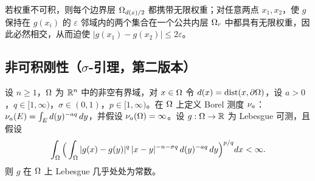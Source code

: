 \begin{remark}[直觉]
若权重不可积，则每个边界层 $\Omega_{d(x)/2}$ 都携带无限权重；对任意两点 $x_1,x_2$，使 $g$ 保持在 $g(x_i)$ 的 $\varepsilon$ 邻域内的两个集合在一个公共内层 $\Omega_{r}$ 中都具有无限权重，因此必然相交，从而迫使 $|g(x_1)-g(x_2)|\le 2\varepsilon$。
\end{remark}

\subsection{非可积刚性（\texorpdfstring{$\sigma$}{sigma}-引理，第二版本）}

\begin{lemma}[不可积刚性]
设 $n\ge 1$，$\Omega$ 为 $\mathbb{R}^n$ 中的非空有界域，对 $x\in\Omega$ 令 $d(x)=\operatorname{dist}(x,\partial\Omega)$，设 $a>0$，$q\in[1,\infty)$，$\sigma\in(0,1)$，$p\in[1,\infty)$。在 $\Omega$ 上定义 Borel 测度 $\nu_{a}$：$\nu_{a}(E)=\int_E d(y)^{-aq}\,dy$，并假设 $\nu_{a}(\Omega)=\infty$。设 $g:\Omega\to\mathbb{R}$ 为 Lebesgue 可测，且假设
\[
  \int_\Omega \Big(\int_\Omega |g(x)-g(y)|^q\,|x-y|^{-n-\sigma q}\,d(y)^{-aq}\,dy\Big)^{p/q} dx<\infty .
\]
则 $g$ 在 $\Omega$ 上 Lebesgue 几乎处处为常数。
\end{lemma}

